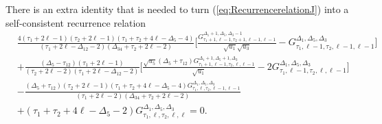 There is an extra identity that is needed to turn (\ref{eq:RecurrencerelationJ}) into a self-consistent recurrence relation
\begin{align}
   & \frac{4 (\tau_1+2 \ell -1) (\tau_2+2 \ell -1) (\tau_1+\tau_2+4 \ell-\Delta_5 -4) }{(\tau_1+2 \ell-\Delta_{12} -2) (\Delta_{34}+\tau_2+2 \ell -2) }\bigg[\frac{G_{\tau_1+1,\ell -1,\tau_2+1,\ell -1,\ell -1}^{\Delta_1+1,\Delta_5,\Delta_3-1}}{\sqrt{u_1} \sqrt{u_3} }-G_{\tau_1,\ell -1,\tau_2,\ell -1,\ell -1}^{\Delta_1,\Delta_5,\Delta_3}\bigg]\nonumber   \\
   & +\frac{ (\Delta_5-\tau_{12}) (\tau_1+2 \ell -1)  }{(\tau_2+2 \ell -2) (\tau_1+2 \ell-\Delta_{12} -2)}    \bigg[\frac{\sqrt{u_5} (\Delta_5+\tau_{12}) G_{\tau_1+1,\ell -1,\tau_2,\ell ,\ell -1}^{\Delta_1+1,\Delta_5+1,\Delta_3}}{\sqrt{u_1} }-2G_{\tau_1,\ell -1,\tau_2,\ell ,\ell -1}^{\Delta_1,\Delta_5,\Delta_3}\bigg]                           \nonumber \\
   & -\frac{(\Delta_5+\tau_{12}) (\tau_2+2 \ell -1) (\tau_1+\tau_2+4 \ell-\Delta_5 -4) G_{\tau_1,\ell ,\tau_2,\ell -1,\ell -1}^{\Delta_1,\Delta_5,\Delta_3}}{(\tau_1+2 \ell -2) (\Delta_{34}+\tau_2+2 \ell -2)}\nonumber                                                                                                                                          \\
   & + (\tau_1+\tau_2+4 \ell -\Delta_5-2)G_{\tau_1,\ell ,\tau_2,\ell,\ell }^{\Delta_1,\Delta_5,\Delta_3} =0.
\end{align}




